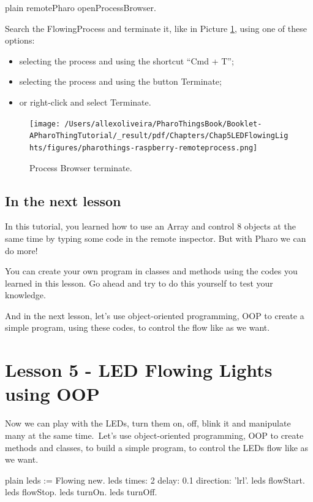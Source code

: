 \documentclass[10pt,twoside,english]{_support/latex/sbabook/sbabook}
\begin{document}
\begin{displaycode}{plain}
remotePharo openProcessBrowser.
\end{displaycode}

Search the FlowingProcess and terminate it, like in Picture \ref{Inspector8LEDsfinal}, using one of these options:

\begin{itemize}
\item selecting the process and using the shortcut “Cmd + T”;
\item selecting the process and using the button Terminate;
\item or right-click and select Terminate.
\end{itemize}


\begin{figure}

\begin{center}
\texttt{[image: /Users/allexoliveira/PharoThingsBook/Booklet-APharoThingTutorial/\_result/pdf/Chapters/Chap5LEDFlowingLights/figures/pharothings-raspberry-remoteprocess.png]}\caption{Process Browser terminate.\label{Inspector8LEDsfinal}}\end{center}
\end{figure}

\section{In the next lesson}
In this tutorial, you learned how to use an Array and control 8 objects at the same time by typing some code in the remote inspector. But with Pharo we can do more!

You can create your own program in classes and methods using the codes you learned in this lesson. Go ahead and try to do this yourself to test your knowledge.

And in the next lesson, let’s use object-oriented programming, OOP to create a simple program, using these codes, to control the flow like as we want.
\chapter{Lesson 5 - LED Flowing Lights using OOP}
Now we can play with the LEDs, turn them on, off, blink it and manipulate many at the same time. Let’s use object-oriented programming, OOP to create methods and classes, to build a simple program, to control the LEDs flow like as we want.

\begin{displaycode}{plain}
leds := Flowing new.
leds times: 2 delay: 0.1 direction: 'lrl'.
leds flowStart.
leds flowStop.
leds turnOn.
leds turnOff.
\end{displaycode}
\end{document}
